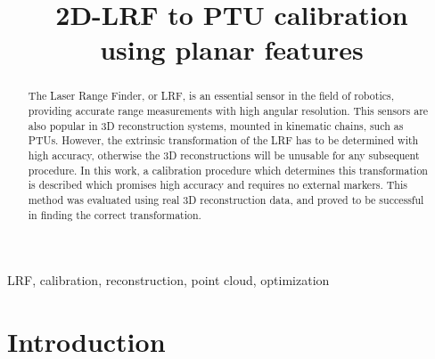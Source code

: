 \documentclass[conference]{IEEEtran}
\begin{document}
\title{
    2D-LRF to PTU calibration \\
    using planar features
}

\author{
\and
{}
\and
{}
}

\maketitle

\begin{abstract}
The Laser Range Finder, or LRF, is an essential sensor in the field of robotics, providing accurate range measurements with high angular resolution. This sensors are also popular in 3D reconstruction systems, mounted in kinematic chains, such as PTUs. However, the extrinsic transformation of the LRF has to be determined with high accuracy, otherwise the 3D reconstructions will be unusable for any subsequent procedure. In this work, a calibration procedure which determines this transformation is described which promises high accuracy and requires no external markers. This method was evaluated using real 3D reconstruction data, and proved to be successful in finding the correct transformation.
\end{abstract}

\begin{IEEEkeywords}
LRF, calibration, reconstruction, point cloud, optimization
\end{IEEEkeywords}

\section{Introduction}\label{section:introduction}
\end{document}
